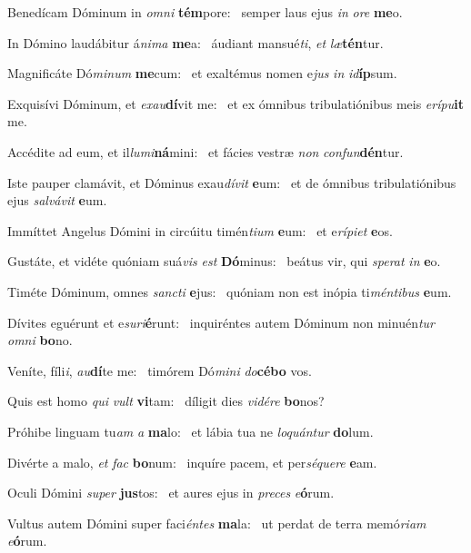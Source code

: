 \item Benedícam Dóminum in \textit{omni} \textbf{tém}pore:~\psstar{} semper laus ejus \textit{in} \textit{ore} \textbf{me}o.
\item In Dómino laudábitur á\textit{nima} \textbf{me}a:~\psstar{} áudiant mansué\textit{ti}, \textit{et} \textit{læ}\textbf{tén}tur.
\item Magnificáte Dó\textit{minum} \textbf{me}cum:~\psstar{} et exaltémus nomen e\textit{jus} \textit{in} \textit{id}\textbf{íp}sum.
\item Exquisívi Dóminum, et \textit{exau}\textbf{dí}vit me:~\psstar{} et ex ómnibus tribulatiónibus meis \textit{erípu}\textbf{it} me.
\item Accédite ad eum, et il\textit{lumi}\textbf{ná}mini:~\psstar{} et fácies vestræ \textit{non} \textit{confun}\textbf{dén}tur.
\item Iste pauper clamávit, et Dóminus exau\textit{dívit} \textbf{e}um:~\psstar{} et de ómnibus tribulatiónibus ejus \textit{salvávit} \textbf{e}um.
\item Immíttet Angelus Dómini in circúitu timén\textit{tium} \textbf{e}um:~\psstar{} et e\textit{rípiet} \textbf{e}os.
\item Gustáte, et vidéte quóniam suá\textit{vis} \textit{est} \textbf{Dó}minus:~\psstar{} beátus vir, qui \textit{sperat} \textit{in} \textbf{e}o.
\item Timéte Dóminum, omnes \textit{sancti} \textbf{e}jus:~\psstar{} quóniam non est inópia ti\textit{méntibus} \textbf{e}um.
\item Dívites eguérunt et e\textit{suri}\textbf{é}\-runt:~\psstar{} inquiréntes autem Dóminum non minuén\textit{tur} \textit{omni} \textbf{bo}no.
\item Veníte, fíli\textit{i}, \textit{au}\textbf{dí}te me:~\psstar{} timórem Dó\textit{mini} \textit{do}\textbf{cé}\textbf{bo} vos.
\item Quis est homo \textit{qui} \textit{vult} \textbf{vi}tam:~\psstar{} díligit dies \textit{vidére} \textbf{bo}nos?
\item Próhibe linguam tu\textit{am} \textit{a} \textbf{ma}lo:~\psstar{} et lábia tua ne \textit{loquántur} \textbf{do}lum.
\item Divérte a malo, \textit{et} \textit{fac} \textbf{bo}num:~\psstar{} inquíre pacem, et per\textit{séquere} \textbf{e}am.
\item Oculi Dómini \textit{super} \textbf{jus}tos:~\psstar{} et aures ejus in \textit{preces} \textit{e}\textbf{ó}rum.
\item Vultus autem Dómini super faci\textit{éntes} \textbf{ma}la:~\psstar{} ut perdat de terra memó\textit{riam} \textit{e}\textbf{ó}rum.
